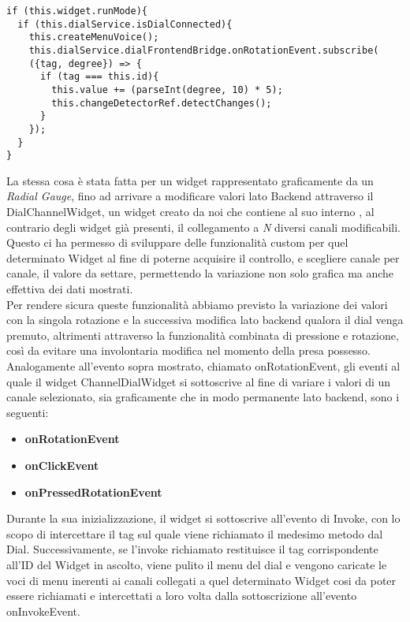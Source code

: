 \begin{lstlisting}[caption={Sottoscrizione evento rotazione},style=javaScriptCode]
if (this.widget.runMode){
  if (this.dialService.isDialConnected){
	this.createMenuVoice();
	this.dialService.dialFrontendBridge.onRotationEvent.subscribe(
	({tag, degree}) => {
	  if (tag === this.id){
		this.value += (parseInt(degree, 10) * 5);
		this.changeDetectorRef.detectChanges();
	  }
	});
  }
}
\end{lstlisting} 

La stessa cosa è stata fatta per un widget rappresentato graficamente da un \emph{Radial Gauge}, fino ad arrivare a modificare valori lato Backend attraverso il DialChannelWidget, un widget creato da noi che contiene al suo interno , al contrario degli widget già presenti, il collegamento a \emph{N} diversi canali modificabili.
Questo ci ha permesso di sviluppare delle funzionalità custom per quel determinato Widget al fine di poterne acquisire il controllo, e scegliere canale per canale, il valore da settare, permettendo la variazione non solo grafica ma anche effettiva dei dati mostrati.\\

Per rendere sicura queste funzionalità abbiamo previsto la variazione dei valori con la singola rotazione e la successiva modifica lato backend qualora il dial venga premuto, altrimenti attraverso la funzionalità combinata di pressione e rotazione, così da evitare una involontaria modifica nel momento della presa possesso.\\

Analogamente all'evento sopra mostrato, chiamato onRotationEvent, gli eventi al quale il widget ChannelDialWidget si sottoscrive al fine di variare i valori di un canale selezionato, sia graficamente che in modo permanente lato backend, sono i seguenti:

\begin{itemize}
\item \textbf{onRotationEvent} 
\item \textbf{onClickEvent} 
\item \textbf{onPressedRotationEvent}
\end{itemize}

Durante la sua inizializzazione, il widget si sottoscrive all'evento di Invoke, con lo scopo di intercettare il tag sul quale viene richiamato il medesimo metodo dal Dial. Successivamente, se l'invoke richiamato restituisce il tag corrispondente all'ID del Widget in ascolto, viene pulito il menu del dial e vengono caricate le voci di menu inerenti ai canali collegati a quel determinato Widget cosi da poter essere richiamati e intercettati a loro volta dalla sottoscrizione all'evento onInvokeEvent.
 
